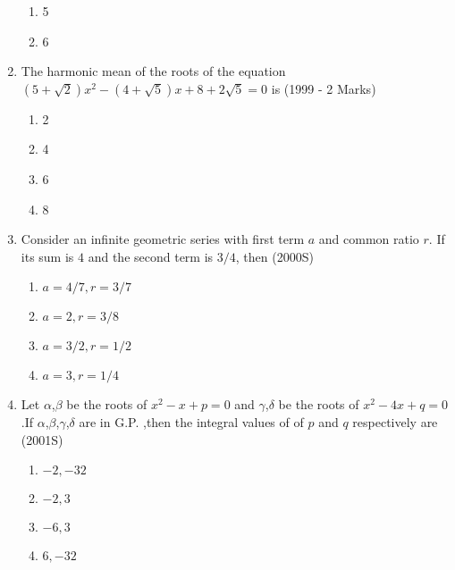 \documentclass[journal,12pt,twocolumn]{IEEEtran}
\theoremstyle{remark}
\begin{document}
\begin{enumerate}
\begin{enumerate}
        \item 5
        \item 6
        \end{enumerate}
\item The harmonic mean of the roots of the equation
        $(5+\sqrt{2})x^2-(4+\sqrt{5})x+8+2\sqrt{5}=0$ is 
        \hfill(1999 - 2 Marks)
        \begin{enumerate}
            \item 2
            \item 4
            \item 6
            \item 8
        \end{enumerate}
\item Consider an infinite geometric series with first term $a$ and common ratio $r$. If its sum is $4$ and the second term is $3/4$, then \hfill (2000S)
        \begin{enumerate}
            \item $a=4/7,r=3/7$
            \item $a=2,r=3/8$
            \item $a=3/2,r=1/2$
            \item $a=3,r=1/4$
            \end{enumerate}
\item Let $\alpha$,$\beta$ be the roots of $x^2-x+p=0$ and $\gamma$,$\delta$ be the roots of $x^2-4x+q=0$.If $\alpha$,$\beta$,$\gamma$,$\delta$ are in G.P. ,then the integral values of of $p$ and $q$ respectively are \hfill(2001S)
            \begin{enumerate}
                \item $-2,-32$
                \item $-2,3$
                \item $-6,3$
                \item $6,-32$
        

\end{enumerate}
\end{enumerate}
\end{document}
